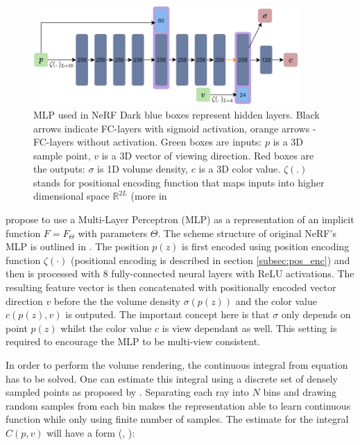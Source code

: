 \begin{figure}[t]
    \centering
    \includegraphics[width=0.9\textwidth]{figures/mlp_nerf.png}
    \caption{MLP used in NeRF \cite{mildenhall2020nerf} Dark blue boxes represent hidden layers. Black arrows indicate FC-layers with sigmoid activation, orange arrows - FC-layers without activation. Green boxes are inputs: $p$ is a 3D sample point, $v$ is a 3D vector of viewing direction. Red boxes are the outputs: $\sigma$ is 1D volume density, $c$ is a 3D color value. $\zeta(.)$ stands for positional encoding function that maps inputs into higher dimensional space $\mathbb{R}^{2L}$ (more in }
    \label{fig:mlp_nerf}
\end{figure}

\cite{mildenhall2020nerf} propose to use a Multi-Layer Perceptron (MLP) as a representation
of an implicit function $F = F_\Theta$ with parameters $\Theta$.
The scheme structure of original NeRF's MLP is outlined in .
The position $p(z)$ is first encoded using position encoding function $\zeta(\cdot)$ (positional encoding is described in section \ref{subsec:pos_enc}) and then is processed with 8 fully-connected neural layers with ReLU activations.
The resulting feature vector is then concatenated with positionally encoded vector direction $v$
before the the volume density $\sigma(p(z))$ and the color value $c(p(z), v)$ is outputed.
The important concept here is that $\sigma$ only depends on point $p(z)$
whilst the color value $c$ is view dependant as well.
This setting is required to encourage the MLP to be multi-view consistent.

In order to perform the volume rendering, the continuous integral from equation  has to be solved.
One can estimate this integral using a discrete set of densely sampled points as proposed by \cite{mildenhall2020nerf}.
Separating each ray into $N$ bins and drawing random samples from each bin
makes the representation able to learn continuous function
while only using finite number of samples.
The estimate for the integral $C(p, v)$ will have a form (\cite{mildenhall2020nerf}, \cite{max1995optical}):

